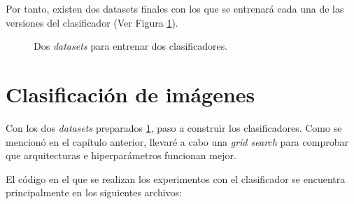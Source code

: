 Por tanto, existen dos datasets finales con los que se entrenará cada una de las versiones del clasificador (Ver Figura \ref{fig:two_final_datasets}).
\begin{figure}[H]
\centering
    \caption{Dos \textit{datasets} para entrenar dos clasificadores.} 
    \label{fig:two_final_datasets}
\end{figure}

\newpage
\section{Clasificación de imágenes}

Con los dos \textit{datasets} preparados \ref{fig:two_final_datasets}, paso a construir los clasificadores. Como se mencionó en el capítulo anterior, llevaré a cabo una \textit{grid search} para comprobar que arquitecturas e hiperparámetros funcionan mejor.

El código en el que se realizan los experimentos con el clasificador se encuentra principalmente en los siguientes archivos:

\vspace{0.2cm}

